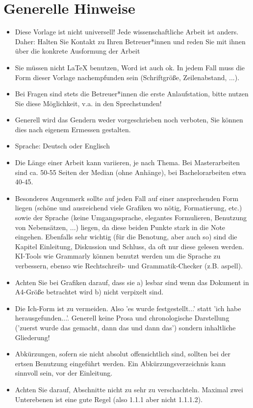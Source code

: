 \documentclass[12pt,oneside]{article}
\begin{document}
\section {Generelle Hinweise}
\begin{itemize}
    \item Diese Vorlage ist nicht universell! Jede wissenschaftliche Arbeit ist anders. Daher: Halten Sie Kontakt zu Ihren Betreuer*innen und reden Sie mit ihnen über die konkrete Ausformung der Arbeit
    \item Sie müssen nicht LaTeX benutzen, Word ist auch ok. In jedem Fall muss die Form dieser Vorlage nachempfunden sein (Schriftgröße, Zeilenabstand, ...).
    \item Bei Fragen sind stets die Betreuer*innen die erste Anlaufstation, bitte nutzen Sie diese Möglichkeit, v.a. in den Sprechstunden!
    \item Generell wird das Gendern weder vorgeschrieben noch verboten, Sie können dies nach eigenem Ermessen gestalten. 
    \item Sprache: Deutsch oder Englisch
     \item Die Länge einer Arbeit kann variieren, je nach Thema. Bei Masterarbeiten sind ca. 50-55 Seiten der Median (ohne Anhänge), bei Bachelorarbeiten etwa 40-45.
     \item Besonderes Augenmerk sollte auf jeden Fall auf einer ansprechenden Form liegen (schöne und ausreichend viele Grafiken wo nötig, Formatierung, etc.) sowie der Sprache (keine Umgangssprache, elegantes Formulieren, Benutzung von Nebensätzen, ...) liegen, da diese beiden Punkte stark in die Note eingehen. Ebenfalls sehr wichtig (für die Benotung, aber auch so) sind die Kapitel Einleitung, Diskussion und Schluss, da oft nur diese gelesen werden. KI-Tools wie Grammarly können benutzt werden um die Sprache zu verbessern, ebenso wie Rechtschreib- und Grammatik-Checker (z.B. aspell). 
     \item Achten Sie bei Grafiken darauf, dass sie a) lesbar sind wenn das Dokument in A4-Größe betrachtet wird b) nicht verpixelt sind.
     \item Die Ich-Form ist zu vermeiden. Also 'es wurde festgestellt...' statt 'ich habe herausgefunden...'. Generell keine Prosa und chronologische Darstellung ('zuerst wurde das gemacht, dann das und dann das') sondern inhaltliche Gliederung!
     \item Abkürzungen, sofern sie nicht absolut offensichtlich sind, sollten bei der ertsen Benutzung eingeführt werden. Ein Abkürzungsverzeichnis kann sinnvoll sein, vor der Einleitung.
     \item Achten Sie darauf, Abschnitte nicht zu sehr zu verschachteln. Maximal zwei Unterebenen ist eine gute Regel (also 1.1.1 aber nicht 1.1.1.2). 
\end{itemize}
\end{document}
